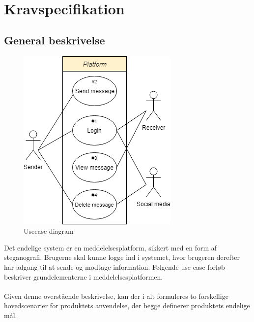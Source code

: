 \section{Kravspecifikation}

\subsection{General beskrivelse}
\begin{table}[H]
    \begin{minipage}{.6\textwidth}
        \begin{figure}[H]
            \centering
            \includegraphics[width=0.70\linewidth]{Projectdoc/Assets/Illustrationer/simple-usecase.png}
            \caption{Usecase diagram}
            \label{fig:usecase}
        \end{figure}
    \end{minipage}
    \begin{minipage}{.4\textwidth}
        Det endelige system er en meddelelsesplatform, sikkert med en form af steganografi. Brugerne skal kunne logge ind i systemet, hvor brugeren derefter har adgang til at sende og modtage information. Følgende use-case forløb beskriver grundelementerne i meddelelsesplatformen.
        \\\\
        Given denne overstående beskrivelse, kan der i alt formuleres to forskellige hovedscenarier for produktets anvendelse, der begge definerer produktets endelige mål.
    \end{minipage}
\end{table}

